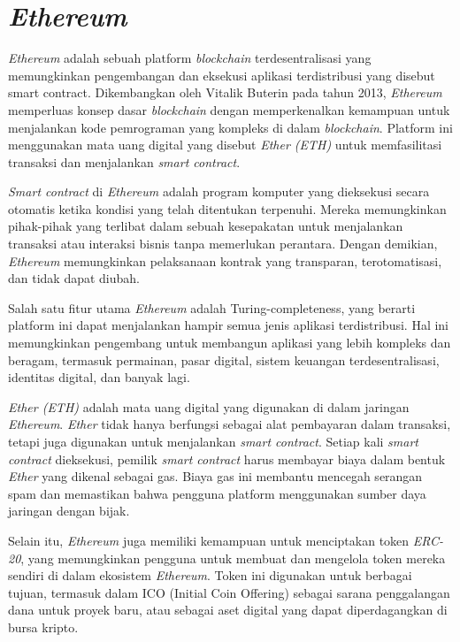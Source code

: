 \section{\emph{Ethereum}}
\emph{Ethereum} adalah sebuah platform \emph{blockchain} terdesentralisasi yang memungkinkan pengembangan dan eksekusi aplikasi terdistribusi yang disebut smart contract. Dikembangkan oleh Vitalik Buterin pada tahun 2013,
\emph{Ethereum} memperluas konsep dasar \emph{blockchain} dengan memperkenalkan kemampuan untuk menjalankan kode pemrograman yang kompleks di dalam \emph{blockchain}. Platform ini menggunakan mata uang digital yang disebut \emph{Ether (ETH)}
untuk memfasilitasi transaksi dan menjalankan \emph{smart contract}. \parencite{wood2014ethereum}

\emph{Smart contract} di \emph{Ethereum} adalah program komputer yang dieksekusi secara otomatis ketika kondisi yang telah ditentukan terpenuhi. Mereka memungkinkan pihak-pihak yang terlibat dalam sebuah kesepakatan untuk menjalankan
transaksi atau interaksi bisnis tanpa memerlukan perantara. Dengan demikian, \emph{Ethereum} memungkinkan pelaksanaan kontrak yang transparan, terotomatisasi, dan tidak dapat diubah. \parencite{antonsopoulos2018mastering}

Salah satu fitur utama \emph{Ethereum} adalah Turing-completeness, yang berarti platform ini dapat menjalankan hampir semua jenis aplikasi terdistribusi. Hal ini memungkinkan pengembang untuk membangun aplikasi yang lebih kompleks dan beragam,
termasuk permainan, pasar digital, sistem keuangan terdesentralisasi, identitas digital, dan banyak lagi. \parencite{burniske2019ethereum}

\emph{Ether (ETH)} adalah mata uang digital yang digunakan di dalam jaringan \emph{Ethereum}. \emph{Ether} tidak hanya berfungsi sebagai alat pembayaran dalam transaksi, tetapi juga digunakan untuk menjalankan \emph{smart contract}.
Setiap kali \emph{smart contract} dieksekusi, pemilik \emph{smart contract} harus membayar biaya dalam bentuk \emph{Ether} yang dikenal sebagai gas. Biaya gas ini membantu mencegah serangan spam dan memastikan bahwa pengguna
platform menggunakan sumber daya jaringan dengan bijak. \parencite{diedrich2017ethereum}

Selain itu, \emph{Ethereum} juga memiliki kemampuan untuk menciptakan token \emph{ERC-20}, yang memungkinkan pengguna untuk membuat dan mengelola token mereka sendiri di dalam ekosistem \emph{Ethereum}. Token ini digunakan untuk berbagai tujuan,
termasuk dalam ICO (Initial Coin Offering) sebagai sarana penggalangan dana untuk proyek baru, atau sebagai aset digital yang dapat diperdagangkan di bursa kripto.

